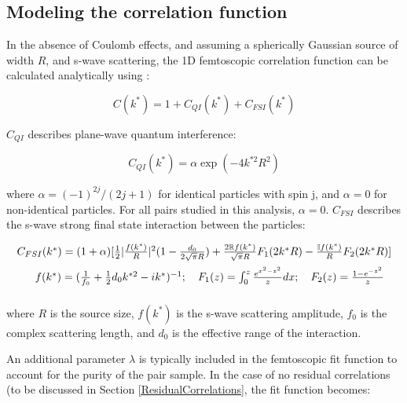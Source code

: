 \documentclass[ALICE,manyauthors]{cernphprep}
\begin{document}
\subsection{Modeling the correlation function}
\label{sec:ModelingCF}


In the absence of Coulomb effects, and assuming a spherically Gaussian source of width $R$, and s-wave scattering, the 1D femtoscopic correlation function can be calculated analytically using \cite{Lednicky:82}:

\begin{equation}
 C(k^{*}) = 1 + C_{QI}(k^{*}) + C_{FSI}(k^{*})
\label{eqn:LednickyEqn}
\end{equation}

$C_{QI}$ describes plane-wave quantum interference:

\begin{equation}
 C_{QI}(k^{*}) = \alpha\exp(-4k^{*2}R^{2})
\label{eqn:CQI}
\end{equation}

where $\alpha = (-1)^{2j}/(2j+1)$ for identical particles with spin j, and $\alpha = 0$ for non-identical particles.  
For all pairs studied in this analysis, $\alpha = 0$.  
$C_{FSI}$ describes the s-wave strong final state interaction between the particles:

\begin{equation}
\begin{array}{l}
\vspace{2mm}  %
  C_{FSI}(k^{*}) = (1+\alpha)[\frac{1}{2}|\frac{f(k^{*})}{R}|^2(1-\frac{d_{0}}{2\sqrt{\pi}R})+\frac{2\mathbb{R}f(k^{*})}{\sqrt{\pi}R}F_{1}(2k^{*}R)-\frac{\mathbb{I}f(k^{*})}{R}F_{2}(2k^{*}R)] \\
\vspace{2mm}  %
  ~~~~~f(k^{*}) = (\frac{1}{f_{0}}+\frac{1}{2}d_{0}k^{*2}-ik^{*})^{-1};~~~
  F_{1}(z) = \int_{0}^{z} \frac{e^{x^{2}-z^{2}}}{z}dx;~~~
  F_{2}(z) = \frac{1-e^{-z^{2}}}{z}
\end{array}  
\label{eqn:CFSI}
\end{equation}

where $R$ is the source size, $f(k^{*})$ is the s-wave scattering amplitude, $f_{0}$ is the complex scattering length, and $d_{0}$ is the effective range of the interaction.

An additional parameter $\lambda$ is typically included in the femtoscopic fit function to account for the purity of the pair sample.  
In the case of no residual correlations (to be discussed in Section \ref{ResidualCorrelations}, the fit function becomes:
\end{document}
